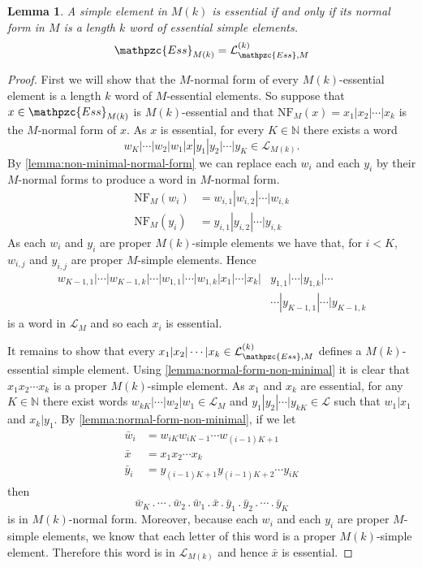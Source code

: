 \documentclass[a4paper,final]{article}
\theoremstyle{plain}
\newtheorem{lemma}[lemma]{Lemma}
\theoremstyle{remark}
\theoremstyle{definition}
\begin{document}
\begin{lemma} \label{lemma:non-minimal-essential}
  A simple element in $M(k)$ is essential if and only if its normal
  form in $M$ is a length $k$ word of essential simple elements.
  \[ {\mathpzc{Ess}}_{M(k)} = {\mathcal{L}}_{{\mathpzc{Ess}},M}^{(k)} \]
\end{lemma}
\begin{proof}
  First we will show that the $M$-normal form of every
  $M(k)$-essential element is a length $k$ word of $M$-essential
  elements.  So suppose that $x\in{\mathpzc{Ess}}_{M(k)}$ is $M(k)$-essential
  and that ${\mathrm{NF}}_M(x) = x_1 |x_2 |\cdots |x_k$ is the $M$-normal form of
  $x$.  As $x$ is essential, for every $K \in {\mathbb{N}}$ there exists a word
  \[ w_K |\cdots| w_2| w_1|x|y_1| y_2 |\cdots| y_K \in {\mathcal{L}}_{M(k)}. \] 
  By \autoref{lemma:non-minimal-normal-form} we can replace each $w_i$
  and each $y_i$ by their $M$-normal forms to produce a word in
  $M$-normal form.
  \begin{align*}
    {\mathrm{NF}}_M(w_i) &= w_{i,1} |w_{i,2} |\cdots| w_{i,k} \\
    {\mathrm{NF}}_M(y_i) &= y_{i,1} |y_{i,2} |\cdots| y_{i,k} 
  \end{align*}
  As each $w_i$ and $y_i$ are proper $M(k)$-simple elements we have
  that, for $i < K$, $w_{i,j}$ and $y_{i,j}$ are proper $M$-simple
  elements.  Hence
  \begin{align*}
  w_{K-1,1} |\cdots |w_{K-1,k}|\cdots|
  w_{1,1} |\cdots |w_{1,k}| 
  x_1 |\cdots |x_k| 
   & y_{1,1} |\cdots |y_{1,k}|\cdots \\
   & \cdots |y_{K-1,1} |\cdots| y_{K-1,k}
  \end{align*}
  is a word in ${\mathcal{L}}_M$ and so each $x_i$ is essential.

  It remains to show that every $x_1 |x_2 |\cdots| x_k \in
  {\mathcal{L}}_{{\mathpzc{Ess}},M}^{(k)}$ defines a $M(k)$-essential simple element.
  Using \autoref{lemma:normal-form-non-minimal} it is clear that $x_1
  x_2 \cdots x_k$ is a proper $M(k)$-simple element.  As $x_1$ and
  $x_k$ are essential, for any $K\in{\mathbb{N}}$ there exist words
  $w_{kK} |\cdots| w_2 |w_1 \in {\mathcal{L}}_M$ and $y_1| y_2| \cdots| y_{kK} \in {\mathcal{L}}$
  such that $w_1 | x_1$ and $x_k | y_1$.  By
  \autoref{lemma:normal-form-non-minimal}, if we let
  \begin{align*}
    \bar w_i &= w_{iK} w_{iK-1} \cdots w_{(i-1)K + 1} \\
    \bar x   &= x_1 x_2 \cdots x_k \\
    \bar y_i &= y_{(i-1)K+1} y_{(i-1)K+2} \cdots y_{iK}
  \end{align*}
  then 
  \[
  \bar w_K {\mathbin{.}}\cdots{\mathbin{.}} \bar w_2{\mathbin{.}} \bar w_1{\mathbin{.}} \bar x{\mathbin{.}} \bar y_1{\mathbin{.}} \bar y_2{\mathbin{.}} \cdots {\mathbin{.}}\bar y_K
  \]
  is in $M(k)$-normal form.  Moreover, because each $w_i$ and each
  $y_i$ are proper $M$-simple elements, we know that each letter of
  this word is a proper $M(k)$-simple element.  Therefore this word
  is in ${\mathcal{L}}_{M(k)}$ and hence $\bar x$ is essential.
\end{proof}
\end{document}

